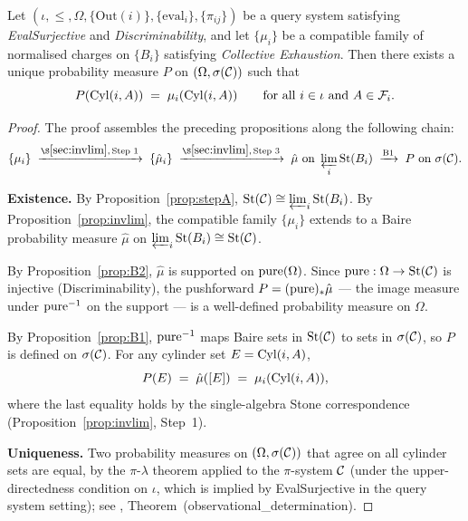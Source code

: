 \begin{theorem}
\label{thm:main}
Let $(\iota, \leq, \Omega, \{\mathrm{Out}(i)\}, \{\mathrm{eval}_i\}, \{\pi_{ij}\})$
be a query system satisfying \emph{EvalSurjective} and \emph{Discriminability}, and
let $\{\mu_i\}$ be a compatible family of normalised charges on $\{B_i\}$ satisfying
\emph{Collective Exhaustion}.  Then there exists a unique probability measure $P$ on
$(\Omega, \sigma(\mathcal{C}))$ such that
\[
  P(\mathrm{Cyl}(i,A)) \;=\; \mu_i(\mathrm{Cyl}(i,A))
  \qquad \text{for all } i \in \iota \text{ and } A \in \mathcal{F}_i.
\]
\end{theorem}

\begin{proof}
The proof assembles the preceding propositions along the following chain:
\[
  \{\mu_i\}
  \;\xrightarrow{\S\ref{sec:invlim},\,\text{Step 1}}\;
  \{\hat{\mu}_i\}
  \;\xrightarrow{\S\ref{sec:invlim},\,\text{Step 3}}\;
  \hat{\mu} \text{ on } \limproj_i \St(B_i)
  \;\xrightarrow{\text{B1}}\;
  P \text{ on } \sigma(\CylGen).
\]

\textbf{Existence.}
By Proposition~\ref{prop:stepA}, $\mathrm{St}(\mathcal{C}) \cong \varprojlim_i \mathrm{St}(B_i)$.  By
Proposition~\ref{prop:invlim}, the compatible family $\{\mu_i\}$ extends to a Baire
probability measure $\hat{\mu}$ on $\varprojlim_i \mathrm{St}(B_i) \cong \mathrm{St}(\mathcal{C})$.

By Proposition~\ref{prop:B2}, $\hat{\mu}$ is supported on $\mathrm{pure}(\Omega)$.  Since
$\mathrm{pure} : \Omega \to \mathrm{St}(\mathcal{C})$ is injective (Discriminability), the pushforward
$P = (\mathrm{pure})_* \hat{\mu}$ --- the image measure under $\mathrm{pure}^{-1}$ on the support ---
is a well-defined probability measure on $\Omega$.

By Proposition~\ref{prop:B1}, $\mathrm{pure}^{-1}$ maps Baire sets in $\mathrm{St}(\mathcal{C})$ to
sets in $\sigma(\mathcal{C})$, so $P$ is defined on $\sigma(\mathcal{C})$.  For any
cylinder set $E = \mathrm{Cyl}(i,A)$,
\[
  P(E) \;=\; \hat{\mu}([E]) \;=\; \mu_i(\mathrm{Cyl}(i,A)),
\]
where the last equality holds by the single-algebra Stone correspondence
(Proposition~\ref{prop:invlim}, Step~1).

\textbf{Uniqueness.}
Two probability measures on $(\Omega, \sigma(\mathcal{C}))$ that agree on all cylinder
sets are equal, by the $\pi$-$\lambda$ theorem applied to the $\pi$-system $\mathcal{C}$
(under the upper-directedness condition on $\iota$, which is implied by EvalSurjective
in the query system setting); see \cite{mahon_paper0}, Theorem~(observational\_determination).
\end{proof}

